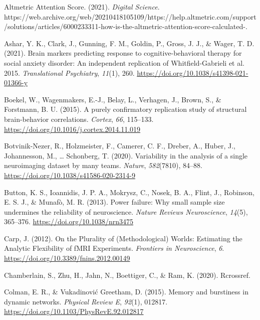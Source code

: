 \documentclass[
  english,
  man,floatsintext]{apa6}
\newlength{\cslhangindent}
\newlength{\cslentryspacingunit} %
\newenvironment{CSLReferences}[2] %
 {%
  \setlength{\parindent}{0pt}
  \ifodd #1
  \let\oldpar\par
  \def\par{\hangindent=\cslhangindent\oldpar}
  \fi
  \setlength{\parskip}{#2\cslentryspacingunit}
 }%
 {}
\begin{document}
\hypertarget{refs}{}
\begin{CSLReferences}{1}{0}
\leavevmode{}%
Altmetric {Attention Score}. (2021). \emph{Digital Science}. https://web.archive.org/web/20210418105109/https://help.altmetric.com/support/solutions/articles/6000233311-how-is-the-altmetric-attention-score-calculated-.

\leavevmode{}%
Ashar, Y. K., Clark, J., Gunning, F. M., Goldin, P., Gross, J. J., \& Wager, T. D. (2021). Brain markers predicting response to cognitive-behavioral therapy for social anxiety disorder: An independent replication of {Whitfield}-{Gabrieli} et al. 2015. \emph{Translational Psychiatry}, \emph{11}(1), 260. \url{https://doi.org/10.1038/s41398-021-01366-y}

\leavevmode{}%
Boekel, W., Wagenmakers, E.-J., Belay, L., Verhagen, J., Brown, S., \& Forstmann, B. U. (2015). A purely confirmatory replication study of structural brain-behavior correlations. \emph{Cortex}, \emph{66}, 115--133. \url{https://doi.org/10.1016/j.cortex.2014.11.019}

\leavevmode{}%
Botvinik-Nezer, R., Holzmeister, F., Camerer, C. F., Dreber, A., Huber, J., Johannesson, M., \ldots{} Schonberg, T. (2020). Variability in the analysis of a single neuroimaging dataset by many teams. \emph{Nature}, \emph{582}(7810), 84--88. \url{https://doi.org/10.1038/s41586-020-2314-9}

\leavevmode{}%
Button, K. S., Ioannidis, J. P. A., Mokrysz, C., Nosek, B. A., Flint, J., Robinson, E. S. J., \& Munafò, M. R. (2013). Power failure: Why small sample size undermines the reliability of neuroscience. \emph{Nature Reviews Neuroscience}, \emph{14}(5), 365--376. \url{https://doi.org/10.1038/nrn3475}

\leavevmode{}%
Carp, J. (2012). On the {Plurality} of ({Methodological}) {Worlds}: {Estimating} the {Analytic Flexibility} of {fMRI Experiments}. \emph{Frontiers in Neuroscience}, \emph{6}. \url{https://doi.org/10.3389/fnins.2012.00149}

\leavevmode{}%
Chamberlain, S., Zhu, H., Jahn, N., Boettiger, C., \& Ram, K. (2020). Rcrossref.

\leavevmode{}%
Colman, E. R., \& Vukadinović Greetham, D. (2015). Memory and burstiness in dynamic networks. \emph{Physical Review E}, \emph{92}(1), 012817. \url{https://doi.org/10.1103/PhysRevE.92.012817}


\end{CSLReferences}
\end{document}
